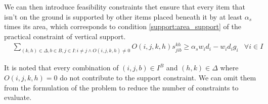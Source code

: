 We can then introduce feasibility constraints thet ensure that every item that isn't on the ground is supported by other items placed beneath it by at least $\alpha_s$ times its area, which corresponds to condition \ref{support:area_support} of the practical constraint of vertical support.
\begin{eqnarray}
    & \sum\limits_{(k, h) \in \Delta, b \in B, j \in I : i \neq j \land O(i, j, k, h) \neq 0}{ O(i, j, k, h)s^{k h}_{j i b}} \ge \alpha_s w_i d_i - w_i d_i g_i & \forall i \in I \label{cons:every_item_is_supported}
\end{eqnarray}

It is noted that every combination of $(i,j,b) \in I^B$ and $(h,k) \in \Delta$ where $O(i, j, k, h) = 0$ do not contribute to the support constraint. We can omit them from the formulation of the problem to reduce the number of constraints to evaluate.